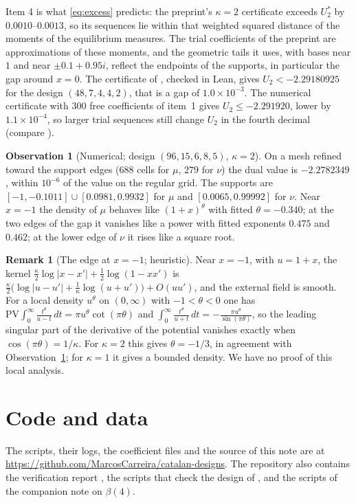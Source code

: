 \documentclass[11pt]{article}
\theoremstyle{definition}
\newtheorem{remark}[theorem]{Remark}
\newtheorem{observation}[theorem]{Observation}
\newcommand{\repo}{\url{https://github.com/MarcosCarreira/catalan-designs}}
\begin{document}
Item 4 is what \eqref{eq:excess} predicts: the preprint's $\kappa=2$ certificate exceeds $U^*_2$ by $0.0010$--$0.0013$, so its sequences lie within that weighted squared distance of the moments of the equilibrium measures. The trial coefficients of the preprint are approximations of these moments, and the geometric tails it uses, with bases near $1$ and near $\pm0.1+0.95i$, reflect the endpoints of the supports, in particular the gap around $x=0$. The certificate of \cite[Proposition~5.11]{Litsey}, checked in Lean, gives $U_2<-2.29180925$ for the design $(48,7,4,4,2)$, that is a gap of $1.0\times10^{-3}$. The numerical certificate with $300$ free coefficients of item~1 gives $U_2\le-2.291920$, lower by $1.1\times10^{-4}$, so larger trial sequences still change $U_2$ in the fourth decimal (compare \cite[Remark~6.1]{Litsey}).

\begin{observation}[Numerical; design $(96,15,6,8,5)$, $\kappa=2$]\label{obs:edges}
On a mesh refined toward the support edges ($688$ cells for $\mu$, $279$ for $\nu$) the dual value is $-2.2782349$, within $10^{-6}$ of the value on the regular grid. The supports are $[-1,-0.1011]\cup[0.0981,0.9932]$ for $\mu$ and $[0.0065,0.99992]$ for $\nu$. Near $x=-1$ the density of $\mu$ behaves like $(1+x)^\theta$ with fitted $\theta=-0.340$; at the two edges of the gap it vanishes like a power with fitted exponents $0.475$ and $0.462$; at the lower edge of $\nu$ it rises like a square root.
\end{observation}

\begin{remark}[The edge at $x=-1$; heuristic]
Near $x=-1$, with $u=1+x$, the kernel $\frac\kappa2\log|x-x'|+\frac12\log(1-xx')$ is $\frac\kappa2\big(\log|u-u'|+\frac1\kappa\log(u+u')\big)+O(uu')$, and the external field is smooth. For a local density $u^\theta$ on $(0,\infty)$ with $-1<\theta<0$ one has $\mathrm{PV}\!\int_0^\infty\frac{t^\theta}{u-t}\,dt=\pi u^\theta\cot(\pi\theta)$ and $\int_0^\infty\frac{t^\theta}{u+t}\,dt=-\frac{\pi u^\theta}{\sin(\pi\theta)}$, so the leading singular part of the derivative of the potential vanishes exactly when $\cos(\pi\theta)=1/\kappa$. For $\kappa=2$ this gives $\theta=-1/3$, in agreement with Observation~\ref{obs:edges}; for $\kappa=1$ it gives a bounded density. We have no proof of this local analysis.
\end{remark}


\section*{Code and data}
The scripts, their logs, the coefficient files and the source of this note are at \repo. The repository also contains the verification report \cite{MCSC}, the scripts that check the design of \cite{OAI}, and the scripts of the companion note \cite{MCSC3} on $\beta(4)$.
\end{document}
